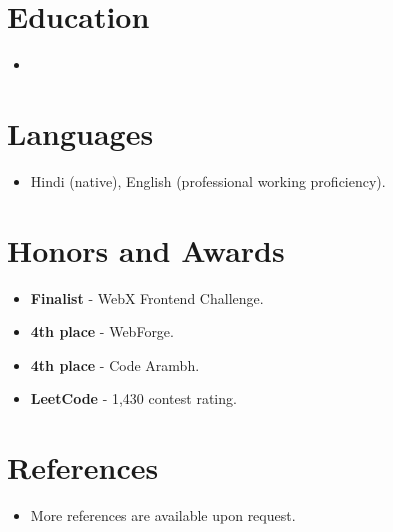 \documentclass[11pt,a4paper,sans]{moderncv}
\begin{document}
\section{Education}
\vspace{1pt}
\begin{itemize}

\item{}

\end{itemize}


\section{Languages}
\vspace{1pt}
\begin{itemize}
\item {Hindi (native), English (professional working proficiency).}
\end{itemize}


\section{Honors and Awards}
\vspace{1pt}
\begin{itemize}
\item{\textbf{Finalist} - WebX Frontend Challenge.}
\item{\textbf{4th place} - WebForge.}
\item{\textbf{4th place} - Code Arambh.}
\item{\textbf{LeetCode} - 1,430 contest rating.}
\end{itemize}


\section{References}
\vspace{1pt}
\begin{itemize}
\item{More references are available upon request.}
\end{itemize}
\end{document}
